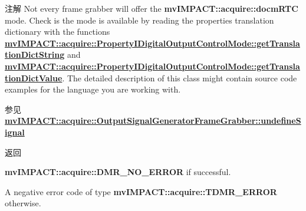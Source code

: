 \begin{DoxyNote}{注解}
Not every frame grabber will offer the {\bfseries mv\+I\+M\+P\+A\+C\+T\+::acquire\+::docm\+R\+T\+C} mode. Check is the mode is available by reading the properties translation dictionary with the functions {\bfseries \hyperlink{classmv_i_m_p_a_c_t_1_1acquire_1_1_enum_property_i_af5ec5a9c3657af2917f4ead78ef067db}{mv\+I\+M\+P\+A\+C\+T\+::acquire\+::\+Property\+I\+Digital\+Output\+Control\+Mode\+::get\+Translation\+Dict\+String}} and {\bfseries \hyperlink{classmv_i_m_p_a_c_t_1_1acquire_1_1_enum_property_i_a0c50700ebff2806621c63d03b624f200}{mv\+I\+M\+P\+A\+C\+T\+::acquire\+::\+Property\+I\+Digital\+Output\+Control\+Mode\+::get\+Translation\+Dict\+Value}}. The detailed description of this class might contain source code examples for the language you are working with.
\end{DoxyNote}
\begin{DoxySeeAlso}{参见}
{\bfseries \hyperlink{classmv_i_m_p_a_c_t_1_1acquire_1_1_output_signal_generator_frame_grabber_a4311d27a250b52f733074778a31ac822}{mv\+I\+M\+P\+A\+C\+T\+::acquire\+::\+Output\+Signal\+Generator\+Frame\+Grabber\+::undefine\+Signal}} 
\end{DoxySeeAlso}
\begin{DoxyReturn}{返回}

\begin{DoxyItemize}
\item {\bfseries mv\+I\+M\+P\+A\+C\+T\+::acquire\+::\+D\+M\+R\+\_\+\+N\+O\+\_\+\+E\+R\+R\+O\+R} if successful.
\item A negative error code of type {\bfseries mv\+I\+M\+P\+A\+C\+T\+::acquire\+::\+T\+D\+M\+R\+\_\+\+E\+R\+R\+O\+R} otherwise. 
\end{DoxyItemize}
\end{DoxyReturn}

